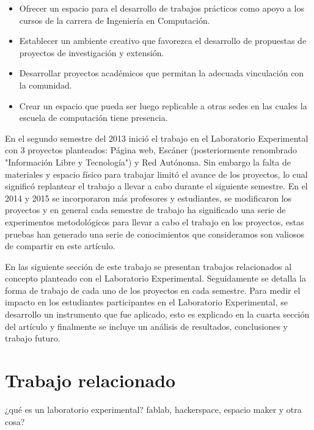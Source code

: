 \documentclass[conference]{IEEEtran}
\begin{document}
\begin{itemize}

\item Ofrecer un espacio para el desarrollo de trabajos prácticos como apoyo a
    los cursos de la carrera de Ingeniería en Computación.

\item Establecer un ambiente creativo que favorezca el desarrollo de propuestas
    de proyectos de investigación y extensión.

\item Desarrollar proyectos académicos que permitan la adecuada vinculación con
    la comunidad.

\item Crear un espacio que pueda ser luego replicable a otras sedes en las
    cuales la escuela de computación tiene presencia.

\end{itemize}


En el segundo semestre del 2013 inició el trabajo en el Laboratorio Experimental
con 3 proyectos planteados: Página web, Escáner (posteriormente renombrado
"Información Libre y Tecnología") y Red Autónoma. Sin embargo la falta de
materiales y espacio físico para trabajar limitó el avance de los proyectos, lo
cual significó replantear el trabajo a llevar a cabo durante el siguiente
semestre. En el 2014 y 2015 se incorporaron más profesores y estudiantes, se
modificaron los proyectos y en general cada semestre de trabajo ha significado
una serie de experimentos metodológicos para llevar a cabo el trabajo en los
proyectos, estas pruebas han generado una serie de conocimientos que
consideramos son valiosos de compartir en este artículo. 

En las siguiente sección de este trabajo se presentan trabajos relacionados al
concepto planteado con el Laboratorio Experimental. Seguidamente se detalla la
forma de trabajo de cada uno de los proyectos en cada semestre. Para medir el
impacto en los estudiantes participantes en el Laboratorio Experimental, se
desarrollo un instrumento que fue aplicado, esto es explicado en la cuarta
sección del artículo y finalmente se incluye un análisis de resultados,
conclusiones y trabajo futuro. 


\section{Trabajo relacionado}

¿qué es un laboratorio experimental? fablab, hackerspace, espacio maker y otra cosa?
\end{document}
